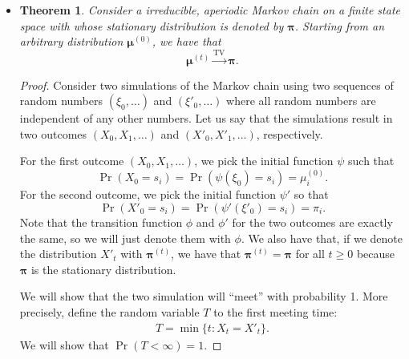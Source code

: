 \documentclass[10pt]{article}
\newtheorem{theorem}[lemma]{Theorem}
\newcommand{\mrm}[1]{\mathrm{#1}}
\newcommand{\ves}[1]{\boldsymbol{#1}}
\begin{document}
\begin{itemize}
  \item \begin{theorem}
    Consider a irreducible, aperiodic Markov chain on a finite state space with whose stationary distribution is denoted by $\ves{\pi}$. Starting from an arbitrary distribution $\ves{\mu}^{(0)}$, we have that
        $$ \ves{\mu}^{(t)} \xrightarrow{\mrm{TV}} \ves{\pi}.$$
  \end{theorem}

  \begin{proof}
    Consider two simulations of the Markov chain using two sequences of random numbers $(\xi_0, \dotsc)$ and $(\xi'_0, \dotsc)$ where all random numbers are independent of any other numbers. Let us say that the simulations result in two outcomes $(X_0, X_1, \dotsc)$ and $(X'_0, X'_1, \dotsc)$, respectively.

    For the first outcome $(X_0, X_1, \dotsc)$, we pick the initial function $\psi$ such that $$\Pr(X_0 = s_i) = \Pr(\psi(\xi_0) = s_i) = \mu^{(0)}_i.$$ For the second outcome, we pick the initial function $\psi'$ so that
    $$\Pr(X'_0 = s_i) = \Pr(\psi'(\xi'_0) = s_i) = \pi_i.$$ 
    Note that the transition function $\phi$ and $\phi'$ for the two outcomes are exactly the same, so we will just denote them with $\phi$. We also have that, if we denote the distribution $X'_t$ with $\ves{\pi}^{(t)}$, we have that $\ves{\pi}^{(t)} = \ves{\pi}$ for all $t \geq 0$ because $\ves{\pi}$ is the stationary distribution.

    We will show that the two simulation will ``meet'' with probability 1. More precisely, define the random variable $T$ to the first meeting time:
    \begin{align*}
        T = \min\{ t : X_t = X'_t \}.
    \end{align*}
    We will show that $\Pr(T < \infty) = 1$.


\end{proof}
\end{itemize}
\end{document}
